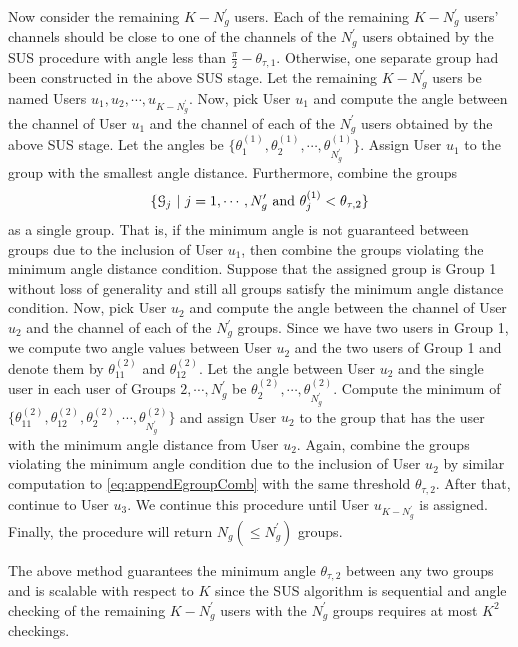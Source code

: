 \documentclass[11pt, draft, onecolumn ]{IEEEtran}
\begin{document}
Now consider the remaining $K-N_g^\prime$ users. Each of the remaining $K-N_g^\prime$ users' channels should be close to one of the channels of the $N_g^\prime$ users obtained by the SUS procedure with angle less than $\frac{\pi}{2}-\theta_{\tau,1}$. Otherwise, one separate group had been constructed in the above SUS stage.  Let the remaining $K-N_g^\prime$ users be named Users $u_1,u_2,\cdots,u_{K-N_g^\prime}$.
Now, pick User $u_1$ and compute the angle between the channel of User $u_1$ and the channel of each of the $N^\prime_g$ users obtained by the above SUS stage. Let the angles be $\{\theta_1^{(1)},\theta_2^{(1)},\cdots,\theta_{N_g^\prime}^{(1)}\}$. Assign User $u_1$ to  the group with the smallest angle distance. Furthermore, combine the groups
\begin{equation}  \label{eq:appendEgroupComb}
\{{\cal G}_j~|~j=1,\cdots,N_g^\prime ~\mbox{and}~ \theta_j^{(1)} < \theta_{\tau,2}\}
\end{equation}
as a single group. That is, if the minimum angle is not guaranteed between groups due to the inclusion of User $u_1$, then combine the groups violating the minimum angle distance condition. Suppose that the assigned group is Group 1 without loss of generality and still all groups satisfy the minimum angle distance condition. Now, pick User $u_2$ and compute the angle between the channel of User $u_2$ and the channel of each of the $N^\prime_g$ groups. Since we have two users in Group 1, we compute two angle values between User $u_2$ and the two users of Group 1 and denote them by $\theta_{11}^{(2)}$ and $\theta_{12}^{(2)}$.  Let the angle between User $u_2$ and the single user in each user of Groups $2,\cdots, N_g^\prime$ be $\theta_2^{(2)},\cdots,\theta_{N_g^\prime}^{(2)}$.
Compute the minimum of $\{\theta_{11}^{(2)},\theta_{12}^{(2)},\theta_2^{(2)},\cdots,\theta_{N_g^\prime}^{(2)}\}$ and assign User $u_2$ to the group that has the user with the minimum angle distance from User $u_2$. Again, combine the groups violating the minimum angle condition due to the inclusion of User $u_2$ by similar computation to \eqref{eq:appendEgroupComb} with the same threshold $\theta_{\tau,2}$.
After that, continue to User $u_3$.    We continue this procedure until User $u_{K-N_g^\prime}$ is assigned. Finally, the procedure will return $N_g(\le N_g^\prime)$ groups.


The above method guarantees the minimum  angle $\theta_{\tau,2}$ between any two groups and is scalable with respect to $K$ since the SUS algorithm is sequential and angle checking of the remaining $K-N_g^\prime$ users with the  $N_g^\prime$ groups requires at most $K^2$ checkings.
\end{document}
